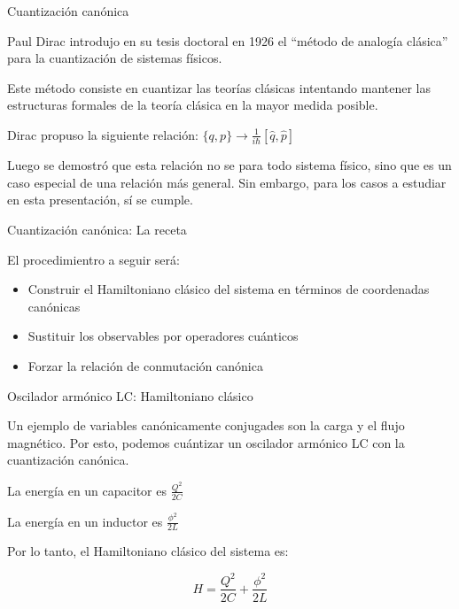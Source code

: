 \begin{frame}{Cuantización canónica}
\protect\hypertarget{cuantizaciuxf3n-canuxf3nica}{}

Paul Dirac introdujo en su tesis doctoral en 1926 el “método de analogía
clásica” para la cuantización de sistemas físicos.

Este método consiste en cuantizar las teorías clásicas intentando
mantener las estructuras formales de la teoría clásica en la mayor
medida posible.

Dirac propuso la siguiente relación:
\(\{q,p\} \rightarrow \frac{1}{i\hbar} [\hat{q},\hat{p}]\)

Luego se demostró que esta relación no se para todo sistema físico, sino
que es un caso especial de una relación más general. Sin embargo, para
los casos a estudiar en esta presentación, sí se cumple.

\end{frame}

\begin{frame}{Cuantización canónica: La receta}
\protect\hypertarget{cuantizaciuxf3n-canuxf3nica-la-receta}{}

El procedimientro a seguir será:

\begin{itemize}
\tightlist
\item
  Construir el Hamiltoniano clásico del sistema en términos de
  coordenadas canónicas
\item
  Sustituir los observables por operadores cuánticos
\item
  Forzar la relación de conmutación canónica
\end{itemize}

\end{frame}

\begin{frame}{Oscilador armónico LC: Hamiltoniano clásico}
\protect\hypertarget{oscilador-armuxf3nico-lc-hamiltoniano-cluxe1sico}{}

Un ejemplo de variables canónicamente conjugades son la carga y el flujo
magnético. Por esto, podemos cuántizar un oscilador armónico LC con la
cuantización canónica.

La energía en un capacitor es \(\frac{Q^2}{2C}\)

La energía en un inductor es \(\frac{\phi^2}{2L}\)

Por lo tanto, el Hamiltoniano clásico del sistema es:

\[H = \frac{Q^2}{2C} + \frac{\phi^2}{2L}\]

\end{frame}

